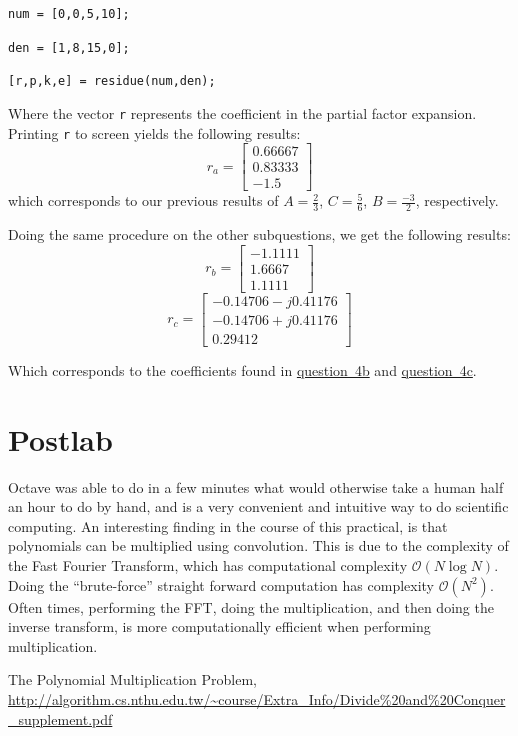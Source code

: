 \documentclass[12pt, a4paper]{article}
\begin{document}
			\noindent\texttt{num = [0,0,5,10];}\par\noindent
			\texttt{den = [1,8,15,0];}\par\noindent
			\texttt{[r,p,k,e] = residue(num,den);}

			\noindent Where the vector \texttt{r} represents the coefficient in the partial factor expansion. Printing \texttt{r} to screen yields the following results:
			\[
				r_a =
				\begin{bmatrix}
					0.66667 \\
					0.83333 \\
					-1.5
				\end{bmatrix}
			\]
			which corresponds to our previous results of $A=\tfrac{2}{3}$, $C=\tfrac{5}{6}$, $B=\tfrac{-3}{2}$, respectively.

			Doing the same procedure on the other subquestions, we get the following results:
			\[
				r_b =
				\begin{bmatrix}
					-1.1111 \\
					1.6667 \\
					1.1111
				\end{bmatrix}
			\]
			\[
				r_c =
				\begin{bmatrix}
					-0.14706 - j0.41176 \\
					-0.14706 + j0.41176 \\
					0.29412
				\end{bmatrix}
			\]

			\noindent Which corresponds to the coefficients found in \mbox{\hyperref[sub:question_4b]{question 4b}} and \mbox{\hyperref[sub:question_4c]{question 4c}}.


	\section{Postlab} %
	\label{sec:postlab}
		Octave was able to do in a few minutes what would otherwise take a human half an hour to do by hand, and is a very convenient and intuitive way to do scientific computing. An interesting finding in the course of this practical, is that polynomials can be multiplied using convolution. This is due to the complexity of the Fast Fourier Transform, which has computational complexity $\mathcal{O}(N\log N)$. Doing the ``brute-force'' straight forward computation has complexity $\mathcal{O}(N^2)$\cite{polyconvolution}. Often times, performing the FFT, doing the multiplication, and then doing the inverse transform, is more computationally efficient when performing multiplication.

	\begin{thebibliography}{9}
		The Polynomial Multiplication Problem, \url{http://algorithm.cs.nthu.edu.tw/~course/Extra_Info/Divide%20and%20Conquer_supplement.pdf}
	\end{thebibliography}
\end{document}
